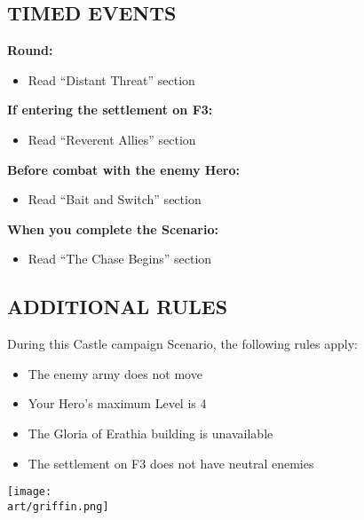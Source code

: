 \newpage

\begin{multicols}{2}

\subsection*{\MakeUppercase{Timed Events}}

\textbf{ Round:}
\begin{itemize}
  \item Read ``Distant Threat'' section
\end{itemize}

\textbf{If entering the settlement on F3:}
\begin{itemize}
  \item Read ``Reverent Allies'' section
\end{itemize}

\textbf{Before combat with the enemy Hero:}
\begin{itemize}
  \item Read ``Bait and Switch'' section
\end{itemize}

\textbf{When you complete the Scenario:}
\begin{itemize}
  \item Read ``The Chase Begins'' section
\end{itemize}

\subsection*{\MakeUppercase{Additional rules}}

During this Castle campaign Scenario, the following rules apply:

\begin{itemize}
  \item The enemy army does not move
  \item Your Hero's maximum Level is 4
  \item The Gloria of Erathia building is unavailable
  \item The settlement on F3 does not have neutral enemies
\end{itemize}

\columnbreak

\texttt{[image: \\art/griffin.png]}

\end{multicols}



